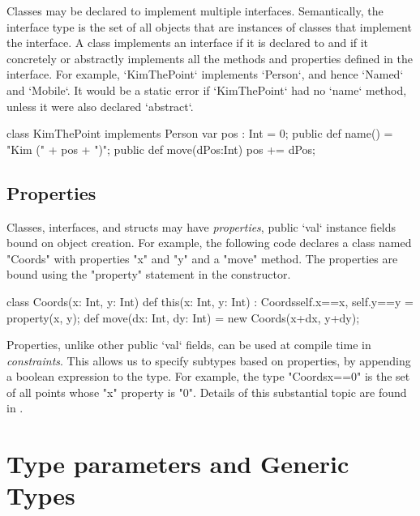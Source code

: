Classes may be declared to implement multiple interfaces. Semantically, the
interface type is the set of all objects that are instances of classes that
implement the interface. A class implements an interface if it is declared to
and if it concretely or abstractly implements all the methods and properties
defined in the interface. For example, \xcd`KimThePoint` implements
\xcd`Person`, and hence \xcd`Named` and \xcd`Mobile`. It would be a static
error if \xcd`KimThePoint` had no \xcd`name` method, unless it were also
declared \xcd`abstract`.

\begin{xten}
class KimThePoint implements Person {
   var pos : Int = 0;
   public def name() = "Kim (" + pos + ")";
   public def move(dPos:Int) { pos += dPos; }
}
\end{xten}
%


\subsection{Properties}
\label{properties}

Classes, interfaces, and structs may have {\em properties}, public \xcd`val` instance
fields bound on object creation. For example, the following code declares a
class named \xcd"Coords" with properties \xcd"x" and \xcd"y" and a \xcd"move"
method. The properties are bound using the \xcd"property" statement in the
constructor.

\begin{xten}
class Coords(x: Int, y: Int) {
  def this(x: Int, y: Int) : Coords{self.x==x, self.y==y} 
    = { property(x, y); }
  def move(dx: Int, dy: Int) = new Coords(x+dx, y+dy);
}
\end{xten}

Properties, unlike other public \xcd`val` fields, can be used  
at compile time in {\em constraints}. This allows us
to specify subtypes based on properties, by appending a boolean expression to
the type. For example, the type \xcd"Coords{x==0}" is the set of all points
whose \xcd"x" property is \xcd"0".  Details of this substantial topic are
found in .



\section{Type parameters and Generic Types}
\label{TypeParameters}

